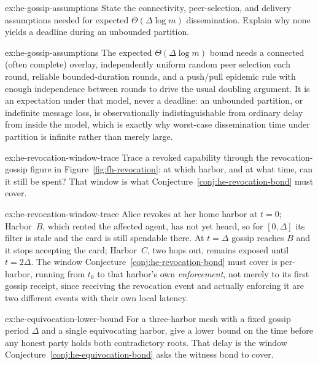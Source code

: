 \documentclass[11pt,a4paper]{article}
\theoremstyle{definition}
\theoremstyle{definition}
\theoremstyle{remark}
\begin{document}

\begin{pdexercise}[kind=Check,rating=1]{ex:he-gossip-assumptions}
State the connectivity, peer-selection, and delivery assumptions needed for
  expected $\Theta(\Delta\log m)$ dissemination. Explain why none yields a deadline
  during an unbounded partition.
\end{pdexercise}
\begin{pdsolution}{ex:he-gossip-assumptions}
The expected $\Theta(\Delta\log m)$ bound needs a connected (often complete)
overlay, independently uniform random peer selection each round, reliable
bounded-duration rounds, and a push/pull epidemic rule with enough independence
between rounds to drive the usual doubling argument. It is an expectation under
that model, never a deadline: an unbounded partition, or indefinite message
loss, is observationally indistinguishable from ordinary delay from inside the
model, which is exactly why worst-case dissemination time under partition is
infinite rather than merely large.
\end{pdsolution}
\begin{pdexercise}[kind=Trace,rating=2]{ex:he-revocation-window-trace}
Trace a revoked capability through \ifpdbook the revocation-gossip figure in \else Figure~\ref{fig:fh-revocation}\fi: at which
  harbor, and at what time, can it still be spent? That window is what
  Conjecture~\ref{conj:he-revocation-bond} must cover.
\end{pdexercise}
\begin{pdsolution}{ex:he-revocation-window-trace}
Alice revokes at her home harbor at $t=0$; Harbor~$B$, which rented the
affected agent, has not yet heard, so for $[0,\Delta]$ its filter is stale and
the card is still spendable there. At $t=\Delta$ gossip reaches $B$ and it stops
accepting the card; Harbor~$C$, two hops out, remains exposed until $t=2\Delta$.
The window Conjecture~\ref{conj:he-revocation-bond} must cover is per-harbor, running from
$t_0$ to that harbor's own \emph{enforcement}, not merely to its first gossip
receipt, since receiving the revocation event and actually enforcing it are two
different events with their own local latency.
\end{pdsolution}
\begin{pdexercise}[kind=Open,rating=3]{ex:he-equivocation-lower-bound}
For a three-harbor mesh with a fixed gossip period $\Delta$ and a single
  equivocating harbor, give a lower bound on the time before any honest party
  holds both contradictory roots. That delay is the window
  Conjecture~\ref{conj:he-equivocation-bond} asks the witness bond to cover.
\end{pdexercise}
\end{document}
